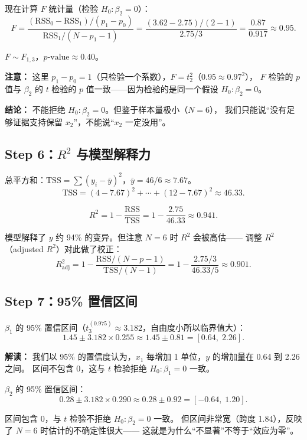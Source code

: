 现在计算 $F$ 统计量（检验 $H_0: \beta_2 = 0$）：
\[
    F = \frac{(\mathrm{RSS}_0 - \mathrm{RSS}_1) / (p_1 - p_0)}
             {\mathrm{RSS}_1 / (N - p_1 - 1)}
      = \frac{(3.62 - 2.75) / (2 - 1)}{2.75 / 3}
      = \frac{0.87}{0.917}
      \approx 0.95.
\]

$F \sim F_{1, 3}$，$p\text{-value} \approx 0.40$。

\textbf{注意：} 这里 $p_1 - p_0 = 1$（只检验一个系数），$F = t_2^2$（$0.95 \approx 0.97^2$），
$F$ 检验的 $p$ 值与 $\beta_2$ 的 $t$ 检验的 $p$ 值一致——因为检验的是同一个假设 $H_0: \beta_2 = 0$。

\textbf{结论：} 不能拒绝 $H_0: \beta_2 = 0$。但鉴于样本量极小（$N=6$），
我们只能说``没有足够证据支持保留 $x_2$''，不能说``$x_2$ 一定没用''。

\subsection{Step 6：$R^2$ 与模型解释力}

总平方和：$\mathrm{TSS} = \sum (y_i - \bar{y})^2$，$\bar{y} = 46/6 \approx 7.67$。
\[
    \mathrm{TSS} = (4-7.67)^2 + \cdots + (12-7.67)^2 \approx 46.33.
\]

\[
    R^2 = 1 - \frac{\mathrm{RSS}}{\mathrm{TSS}} = 1 - \frac{2.75}{46.33} \approx 0.941.
\]

模型解释了 $y$ 约 94\% 的变异。但注意 $N=6$ 时 $R^2$ 会被高估——
调整 $R^2$（adjusted $R^2$）对此做了校正：
\[
    R^2_{\text{adj}} = 1 - \frac{\mathrm{RSS}/(N-p-1)}{\mathrm{TSS}/(N-1)}
    = 1 - \frac{2.75/3}{46.33/5} \approx 0.901.
\]

\subsection{Step 7：95\% 置信区间}

$\beta_1$ 的 95\% 置信区间（$t_{3}^{(0.975)} \approx 3.182$，自由度小所以临界值大）：
\[
    1.45 \pm 3.182 \times 0.255 \approx 1.45 \pm 0.81 = [0.64,\; 2.26].
\]

\textbf{解读：} 我们以 95\% 的置信度认为，$x_1$ 每增加 1 单位，$y$ 的增加量在 0.64 到 2.26 之间。
区间不包含 0，这与 $t$ 检验拒绝 $H_0: \beta_1 = 0$ 一致。

$\beta_2$ 的 95\% 置信区间：
\[
    0.28 \pm 3.182 \times 0.290 \approx 0.28 \pm 0.92 = [-0.64,\; 1.20].
\]

区间包含 0，与 $t$ 检验不拒绝 $H_0: \beta_2 = 0$ 一致。
但区间非常宽（跨度 1.84），反映了 $N=6$ 时估计的不确定性很大——
这就是为什么``不显著''不等于``效应为零''。

